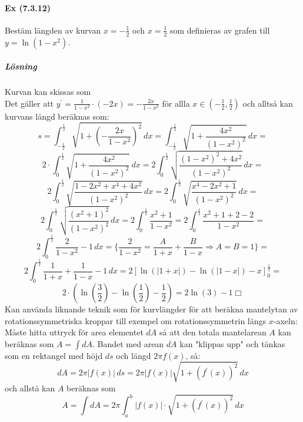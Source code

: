 \paragraph*{Ex (7.3.12)} Bestäm längden av kurvan $x=-\frac{1}{2}$ och $x=\frac{1}{2}$ som definieras av grafen till $y=\ln(1-x^2)$.
\subparagraph{Lösning}
Kurvan kan skissas som\\
Det gäller att $y^\prime=\frac{1}{1-x^2}\cdot(-2x)=-\frac{2x}{1-x^2}$ för allla $x\in(-\frac{1}{2},\frac{1}{2})$ och alltså kan kurvans längd beräknas som:
\begin{equation*}
    s=\int_{-\frac{1}{2}}^\frac{1}{2}\sqrt{1+(-\frac{2x}{1-x^2})^2}\, dx=
    \int_{-\frac{1}{2}}^\frac{1}{2}\sqrt{1+\frac{4x^2}{(1-x^2)^2}}\, dx=
\end{equation*}
\begin{equation*}
    2\cdot\int_0^\frac{1}{2}\sqrt{1+\frac{4x^2}{(1-x^2)^2}}\, dx=
    2\int_0^\frac{1}{2}\sqrt{\frac{(1-x^2)^2+4x^2}{(1-x^2)^2}}\, dx=
\end{equation*}
\begin{equation*}
    2\int_0^\frac{1}{2}\sqrt{\frac{1-2x^2+x^4+4x^2}{(1-x^2)^2}}\, dx=
    2\int_0^\frac{1}{2}\sqrt{\frac{x^4-2x^2+1}{(1-x^2)^2}}\, dx=
\end{equation*}
\begin{equation*}
    2\int_0^\frac{1}{2}\sqrt{\frac{(x^2+1)^2}{(1-x^2)^2}}\, dx=
    2\int_0^\frac{1}{2}\frac{x^2+1}{1-x^2}=
    2\int_0^\frac{1}{2}\frac{x^2+1+2-2}{1-x^2}=
\end{equation*}
\begin{equation*}
    2\int_0^\frac{1}{2}\frac{2}{1-x^2}-1\, dx=
    \{\frac{2}{1-x^2}=\frac{A}{1+x}+\frac{B}{1-x}\Rightarrow A=B=1\}=
\end{equation*}
\begin{equation*}
    2\int_0^\frac{1}{2}\frac{1}{1+x}+\frac{1}{1-x}-1\, dx=
    2[\ln(|1+x|)-\ln(|1-x|)-x]_0^\frac{1}{2}=
\end{equation*}
\begin{equation*}
    2\cdot(\ln(\frac{3}{2})-\ln(\frac{1}{2})-\frac{1}{2})=
    2\ln(3)-1 \Box
\end{equation*}
Kan använda liknande teknik som för kurvlängder för att beräkna mantelytan av rotationssymmetriska kroppar till exempel om rotationssymmetrin längs $x$-axeln:\\
Måste hitta uttryck för area elementet $dA$ så att den totala mantelarean $A$ kan beräknas som $A=\int dA$.
Bandet med arean $dA$ kan "klippas upp" och tänkas som en rektangel med höjd $ds$ och längd $2\pi f(x)$, så:
\begin{equation*}
    dA=2\pi|f(x)|\, ds=
    2\pi|f(x)|\sqrt{1+(f^\prime(x))^2}\, dx
\end{equation*}
och allstå kan $A$ beräknas som
\begin{equation*}
    A=\int dA=2\pi\int_a^b|f(x)|\cdot\sqrt{1+(f^\prime(x))^2}\, dx
\end{equation*}